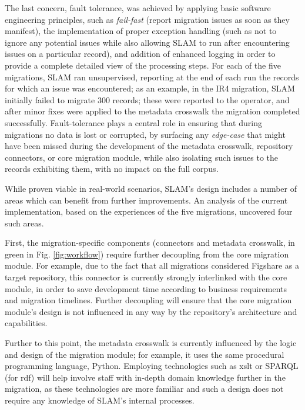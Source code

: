 The last concern, fault tolerance, was achieved by applying basic software engineering principles, such as \emph{fail-fast} (report migration issues as soon as they manifest), the implementation of proper exception handling (such as not to ignore any potential issues while also allowing SLAM to run after encountering issues on a particular record), and addition of enhanced logging in order to provide a complete detailed view of the processing steps. For each of the five migrations, SLAM ran unsupervised, reporting at the end of each run the records for which an issue was encountered; as an example, in the IR4 migration, SLAM initially failed to migrate 300 records; these were reported to the operator, and after minor fixes were applied to the metadata crosswalk the migration completed successfully. Fault-tolerance plays a central role in ensuring that during migrations no data is lost or corrupted, by surfacing any \emph{edge-case} that might have been missed during the development of the metadata crosswalk, repository connectors, or core migration module, while also isolating such issues to the records exhibiting them, with no impact on the full corpus. 

While proven viable in real-world scenarios, SLAM's design includes a number of areas which can benefit from further improvements. An analysis of the current implementation, based on the experiences of the five migrations, uncovered four such areas.

First, the migration-specific components (connectors and metadata crosswalk, in green in Fig. \ref{fig:workflow}) require further decoupling from the core migration module. For example, due to the fact that all migrations considered Figshare as a target repository, this connector is currently strongly interlinked with the core module, in order to save development time according to business requirements and migration timelines. Further decoupling will ensure that the core migration module's design is not influenced in any way by the repository's architecture and capabilities.

Further to this point, the metadata crosswalk is currently influenced by the logic and design of the migration module; for example, it uses the same procedural programming language, Python. Employing technologies such as \gls{xslt} or SPARQL (for \gls{rdf}) will help involve staff with in-depth domain knowledge further in the migration, as these technologies are more familiar and such a design does not require any knowledge of SLAM's internal processes.

